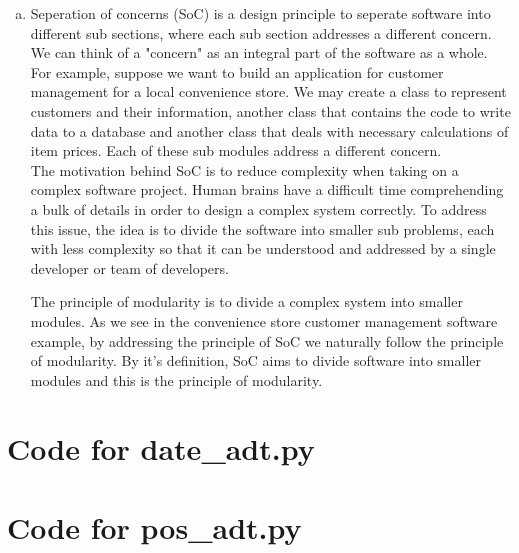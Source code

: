 \documentclass[12pt]{article}
\begin{document}
\begin{enumerate}[(a)]
\item Seperation of concerns (SoC) is a design principle to seperate software into different sub sections, where each sub section addresses a different concern. We can think of a "concern" as an integral part of the software as a whole. For example, suppose we want to build an application for customer management for a local convenience store. We may create a class to represent customers and their information, another class that contains the code to write data to a database and another class that deals with necessary calculations of item prices. Each of these sub modules address a different concern.\\

The motivation behind SoC is to reduce complexity when taking on a complex software project. Human brains have a difficult time comprehending a bulk of details in order to design a complex system correctly. To address this issue, the idea is to divide the software into smaller sub problems, each with less complexity so that it can be understood and addressed by a single developer or team of developers.

The principle of modularity is to divide a complex system into smaller modules. As we see in the convenience store customer management software example, by addressing the principle of SoC we naturally follow the principle of modularity. By it's definition, SoC aims to divide software into smaller modules and this is the principle of modularity.\\

\end{enumerate}

\newpage

\lstset{language=Python, basicstyle=\tiny, breaklines=true, showspaces=false,
  showstringspaces=false, breakatwhitespace=true}

\def\thesection{\Alph{section}}

\section{Code for date\_adt.py}

\noindent 

\newpage

\section{Code for pos\_adt.py}
\end{document}
